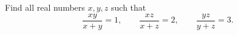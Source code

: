 Find all real numbers $x,y,z$ such that
\[\dfrac{xy}{x+y}=1,\qquad\dfrac{xz}{x+z}=2,\qquad\dfrac{yz}{y+z}=3.\]
